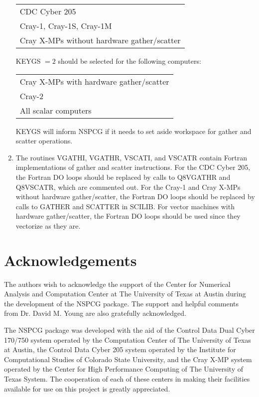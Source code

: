 \begin{enumerate}
     \begin{tabular}{l}
            CDC Cyber 205 \\
            Cray-1, Cray-1S, Cray-1M \\
            Cray X-MPs without hardware gather/scatter
     \end{tabular}
 
     KEYGS $= 2$ should be selected for the following computers:
 
     \begin{tabular}{l}
            Cray X-MPs with hardware gather/scatter \\
            Cray-2 \\
            All scalar computers
     \end{tabular}
 
     KEYGS will inform NSPCG if it needs to set aside workspace
     for gather and scatter operations.
 
   \item
     The routines VGATHI, VGATHR, VSCATI, and VSCATR contain
     Fortran implementations of gather and scatter instructions.
     For the CDC Cyber 205, the Fortran DO loops should be
     replaced by calls to Q8VGATHR and Q8VSCATR, which are
     commented out.  For the Cray-1 and Cray X-MPs without
     hardware gather/scatter, the Fortran DO loops should be
     replaced by calls to GATHER and SCATTER in SCILIB.
     For vector machines with hardware gather/scatter, the
     Fortran DO loops should be used since they vectorize as
     they are.
\end{enumerate}

\newpage
\section{Acknowledgements}
\indent

The authors wish to acknowledge the support of the Center for
Numerical Analysis and Computation Center at The University of Texas 
at Austin during the development of the NSPCG package.  The support 
and helpful comments from Dr. David M. Young are also gratefully 
acknowledged.

The NSPCG package was developed with the aid of the Control Data
Dual Cyber 170/750 system operated by the Computation Center of The
University of Texas at Austin, the Control Data Cyber 205 system
operated by the Institute for Computational Studies of Colorado
State University, and the Cray X-MP system operated by the Center for
High Performance Computing of The University of Texas System.  The
cooperation of each of these centers in making their facilities
available for use on this project is greatly appreciated.

